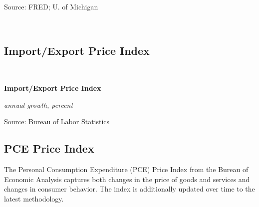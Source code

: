 \documentclass{report}
\makeatletter
\newcommand{\tbllink}[1]{\href{https://raw.githubusercontent.com/bdecon/US-chartbook/master/chartbook/data/#1}{\faTable}}
\newcommand*\short[1]{\expandafter\@gobbletwo\number\numexpr#1\relax}
\newcommand{\dateaxisticks}{
		date coordinates in=x, axis line style={draw=none},
		xmax={2020-10-01},
		max space between ticks=40,	    
		xtick={{1990-01-01}, {1992-01-01}, {1994-01-01}, 
			{1996-01-01}, {1998-01-01}, {2000-01-01}, 
			{2002-01-01}, {2004-01-01}, {2006-01-01},
			{2008-01-01}, {2010-01-01}, {2012-01-01}, {2014-01-01},
		    {2016-01-01}, {2018-01-01}, {2020-01-01}},
		minor xtick={{1989-01-01}, {1991-01-01}, {1993-01-01},
			{1995-01-01}, {1997-01-01}, {1999-01-01}, 
			{2001-01-01}, {2003-01-01}, {2005-01-01}, {2007-01-01},
		    {2009-01-01}, {2011-01-01}, {2013-01-01}, {2015-01-01},
		    {2017-01-01}, {2019-01-01}},
		enlarge y limits={0.06}, enlarge x limits={0.01},
		}
\newcommand{\bbar}[2]{extra #1 ticks = {{#2}}, extra #1 tick labels = ,
		extra #1 tick style = {grid=major, grid style={thick, black!25}},}
\newcommand{\stdline}[4]{\addplot[very thick, no markers, color=#1] 
		table [x=#2, y=#3, col sep=comma] {#4};	}
\newcommand{\rbars}{
		\fill[color=black!10] (axis cs:{1990-07-01},\pgfkeysvalueof{/pgfplots/ymin}) rectangle 
			(axis cs:{1991-03-01}, \pgfkeysvalueof{/pgfplots/ymax});
		\fill[color=black!10] (axis cs:{2007-12-01},\pgfkeysvalueof{/pgfplots/ymin}) rectangle 
			(axis cs:{2009-07-01}, \pgfkeysvalueof{/pgfplots/ymax});
		\fill[color=black!10] (axis cs:{2001-03-01},\pgfkeysvalueof{/pgfplots/ymin}) rectangle 
			(axis cs:{2001-11-01}, \pgfkeysvalueof{/pgfplots/ymax});
		\fill[color=black!10] (axis cs:{2020-02-01},\pgfkeysvalueof{/pgfplots/ymin}) rectangle 
			(axis cs:{2020-10-01}, \pgfkeysvalueof{/pgfplots/ymax});}
\makeatother
\begin{document}
{{{{{{{{{\begin{minipage}{0.36\textwidth}
\footnotesize{Source: FRED; U. of Michigan} \hfill \tbllink{infbreak.csv}
\end{minipage} \hspace{6mm} 
\begin{minipage}{0.35\textwidth}
\small \\


\end{minipage}
\newpage
\subsection*{\color{black!70} \seriffont Import/Export Price Index}
\begin{minipage}{0.76\textwidth}
\small  \\



\vspace{3mm}

\normalsize \textbf{Import/Export Price Index}

\footnotesize{\textit{annual growth, percent}}

\vspace{28mm}

\hspace{4mm} 

\vspace{3mm}

\footnotesize{Source: Bureau of Labor Statistics} \hfill \tbllink{mxpi.csv}

\vspace{16mm}

\subsection*{\color{black!70} \seriffont PCE Price Index}
\small The Personal Consumption Expenditure (PCE) Price Index from the Bureau of Economic Analysis captures both changes in the price of goods and services and changes in consumer behavior. The index is additionally updated over time to the latest methodology. 


\end{minipage}}}}}}}}}}
\end{document}
